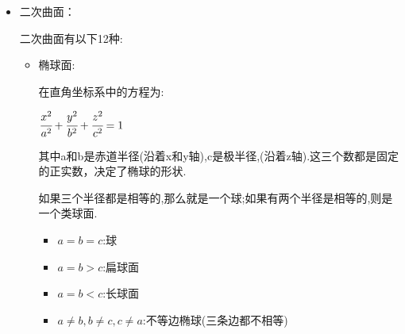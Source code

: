 \documentclass[UTF8,12pt]{ctexbook}
\newcommand{\defFunction}[1]{f(#1)}
\begin{document}
{{{{\begin{itemize}
{\begin{itemize}
{                      \begin{itemize}
                        \item 绕x轴旋转,曲面表达式为:$\defFunction{x,\pm\sqrt{y^2 + z^2}} = 0$
                        \item 绕y轴旋转,曲面表达式为:$\defFunction{\pm\sqrt{x^2 + z^2},y} = 0$
                      \end{itemize}
                      }
                \item {
                      设XOZ平面上有曲线$\defFunction{x,z} = 0$:

                      \begin{itemize}
                        \item 绕x轴旋转,曲面表达式为:$\defFunction{x,\pm\sqrt{y^2 + z^2}} = 0$
                        \item 绕z轴旋转,曲面表达式为:$\defFunction{\pm\sqrt{x^2 + y^2},z} = 0$
                      \end{itemize}
                      }
              \end{itemize}
              }
        \item {
              二次曲面：

              二次曲面有以下12种:
              \begin{itemize}
                \item {
                      椭球面:

                      在直角坐标系中的方程为:

                      $\cfrac{x^2}{a^2} + \cfrac{y^2}{b^2} + \cfrac{z^2}{c^2} = 1$

                      其中a和b是赤道半径(沿着x和y轴),c是极半径,(沿着z轴).这三个数都是固定的正实数，决定了椭球的形状.

                      如果三个半径都是相等的,那么就是一个球;如果有两个半径是相等的,则是一个类球面.

                      \begin{itemize}
                        \item $a = b = c$:球
                        \item $a = b > c$:扁球面
                        \item $a = b < c$:长球面
                        \item $a \neq b,b \neq c,c \neq a$:不等边椭球(三条边都不相等)
                      \end{itemize}

}
\end{itemize}}
\end{itemize}}}}}
\end{document}
